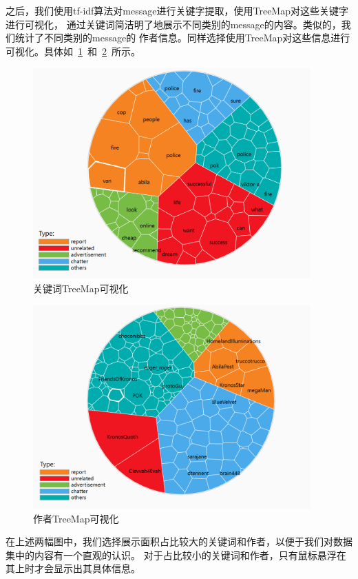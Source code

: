 \documentclass[a4paper]{article}
\begin{document}
之后，我们使用tf-idf算法对message进行关键字提取，使用TreeMap对这些关键字进行可视化，
通过关键词简洁明了地展示不同类别的message的内容。类似的，我们统计了不同类别的message的
作者信息。同样选择使用TreeMap对这些信息进行可视化。具体如~\ref{fig:1-keyword}~和~\ref{fig:1-author}~所示。
\begin{figure}[H]
  \centering
  \includegraphics[width=0.95\textwidth]{images/1-keyword.png}
  \caption{关键词TreeMap可视化}\label{fig:1-keyword}
  \vspace{\baselineskip}
\end{figure}
\begin{figure}[H]
  \centering
  \includegraphics[width=0.95\textwidth]{images/1-author.png}
  \caption{作者TreeMap可视化}\label{fig:1-author}
  \vspace{\baselineskip}
\end{figure}
在上述两幅图中，我们选择展示面积占比较大的关键词和作者，以便于我们对数据集中的内容有一个直观的认识。
对于占比较小的关键词和作者，只有鼠标悬浮在其上时才会显示出其具体信息。
\end{document}
